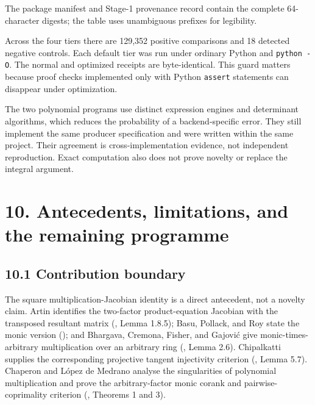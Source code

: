\documentclass[
  11pt,
  a4paper,
]{article}
\begin{document}
The package manifest and Stage-1 provenance record contain the complete
64-character digests; the table uses unambiguous prefixes for
legibility.

Across the four tiers there are 129,352 positive comparisons and 18
detected negative controls. Each default tier was run under ordinary
Python and \texttt{python\ -O}. The normal and optimized receipts are
byte-identical. This guard matters because proof checks implemented only
with Python \texttt{assert} statements can disappear under optimization.

The two polynomial programs use distinct expression engines and
determinant algorithms, which reduces the probability of a
backend-specific error. They still implement the same producer
specification and were written within the same project. Their agreement
is cross-implementation evidence, not independent reproduction. Exact
computation also does not prove novelty or replace the integral
argument.

\section{10. Antecedents, limitations, and the remaining
programme}\label{antecedents-limitations-and-the-remaining-programme}

\subsection{10.1 Contribution boundary}\label{contribution-boundary}

The square multiplication-Jacobian identity is a direct antecedent, not
a novelty claim. Artin identifies the two-factor product-equation
Jacobian with the transposed resultant matrix
(, Lemma 1.8.5); Basu,
Pollack, and Roy state the monic version
(); and
Bhargava, Cremona, Fisher, and Gajović give monic-times-arbitrary
multiplication over an arbitrary ring
(,
Lemma 2.6). Chipalkatti supplies the corresponding projective tangent
injectivity criterion (,
Lemma 5.7). Chaperon and López de Medrano analyse the singularities of
polynomial multiplication and prove the arbitrary-factor monic corank
and pairwise-coprimality criterion
(, Theorems 1 and 3).
\end{document}
